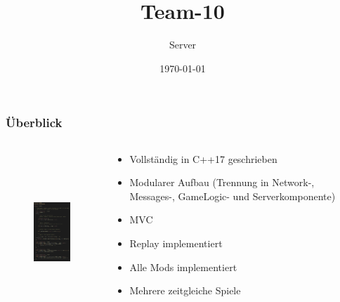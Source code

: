 \documentclass[aspectratio=169]{beamer}
\title{Team-10}
\author{Server}
\date{\today}
\begin{document}
\maketitle

\begin{frame}
    \frametitle{Überblick}
    \begin{columns}
        \begin{column}{0.4\textwidth}
            \begin{center}
                \begin{figure}[H]
                    \includegraphics[height=6cm]{screenshot.png}
                \end{figure}
            \end{center}
        \end{column}
        \begin{column}{0.6\textwidth}
            \begin{itemize}
                \item Vollständig in C++17 geschrieben
                    \pause
                \item Modularer Aufbau (Trennung in Network-, Messages-, GameLogic- und Serverkomponente)
                    \pause
                \item MVC
                    \pause
                \item Replay implementiert
                    \pause
                \item Alle Mods implementiert
                    \pause
                \item Mehrere zeitgleiche Spiele
            \end{itemize}
        \end{column}
    \end{columns}
\end{frame}
\end{document}
